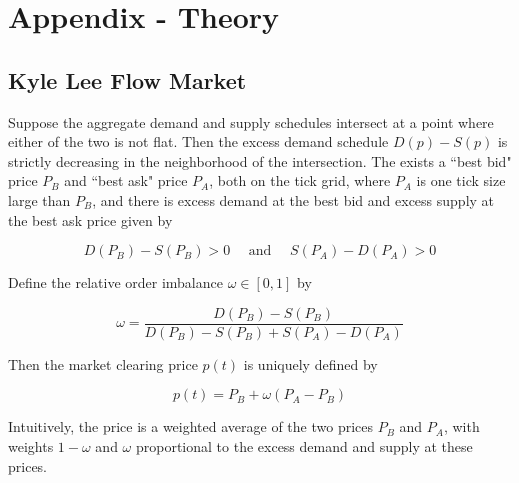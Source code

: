 \documentclass{article}
\begin{document}
\newpage
\appendix

\section{Appendix - Theory}

\subsection{Kyle Lee Flow Market}

\noindent
Suppose the aggregate demand and supply schedules intersect at a point where either of the two is not flat. Then the excess demand schedule $D(p) - S(p)$ is strictly decreasing in the neighborhood of the intersection. The exists a ``best bid" price $P_B$ and ``best ask" price $P_A$, both on the tick grid, where $P_A$ is one tick size large than $P_B$, and there is excess demand at the best bid and excess supply at the best ask price given by 

$$D(P_B) - S(P_B) > 0 \quad \text{ and } \quad S(P_A) - D(P_A) > 0$$

\noindent
Define the relative order imbalance $\omega \in [0,1]$ by 

$$\omega = \frac{D(P_B) - S(P_B)}{D(P_B) - S(P_B) + S(P_A) - D(P_A)}$$

\noindent
Then the market clearing price $p(t)$ is uniquely defined by 

$$p(t) = P_B + \omega (P_A - P_B)$$

\noindent
Intuitively, the price is a weighted average of the two prices $P_B$ and $P_A$, with weights $1-\omega$ and $\omega$ proportional to the excess demand and supply at these prices. 
\end{document}
